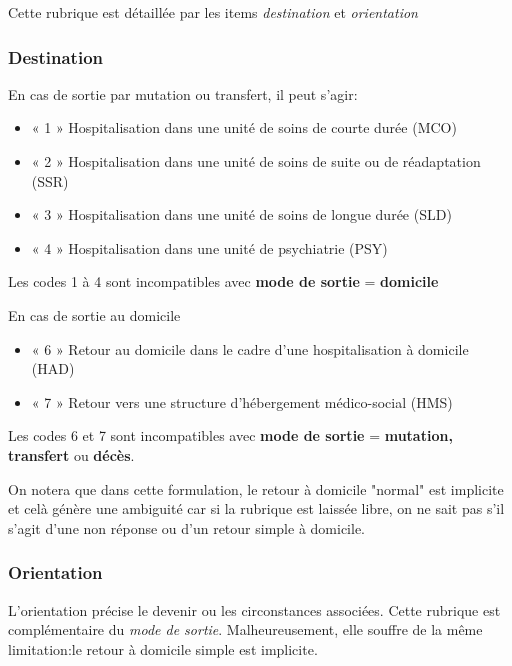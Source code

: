 \documentclass[12pt,english,french,twoside]{book}\usepackage[]{graphicx}\usepackage[]{color}
\begin{document}
Cette rubrique est détaillée par les items \emph{destination} et \emph{orientation}

\subsubsection{Destination}

En cas de sortie par mutation ou transfert, il peut s'agir:
\begin{itemize}
  \item « 1 » Hospitalisation dans une unité de soins de courte durée (MCO)
  \item « 2 » Hospitalisation dans une unité de soins de suite ou de réadaptation (SSR)
  \item « 3 » Hospitalisation dans une unité de soins de longue durée (SLD)
  \item « 4 » Hospitalisation dans une unité de psychiatrie (PSY)
\end{itemize}
Les codes 1 à 4 sont incompatibles avec \textbf{mode de sortie} = \textbf{domicile}

En cas de sortie au domicile
\begin{itemize}
  \item « 6 » Retour au domicile dans le cadre d’une hospitalisation à domicile (HAD)
  \item « 7 » Retour vers une structure d'hébergement médico-social (HMS)
\end{itemize}
Les codes 6 et 7 sont incompatibles avec \textbf{mode de sortie} = \textbf{mutation, transfert} ou \textbf{décès}.

On notera que dans cette formulation, le retour à domicile "normal" est implicite et celà génère une ambiguité car si la rubrique est laissée libre, on ne sait pas s'il s'agit d'une non réponse ou d'un retour simple à domicile.

\subsubsection{Orientation}

L'orientation précise le devenir ou les circonstances associées. Cette rubrique est complémentaire du \emph{mode de sortie}. Malheureusement, elle souffre de la même limitation:le retour à domicile simple est implicite.
\end{document}
